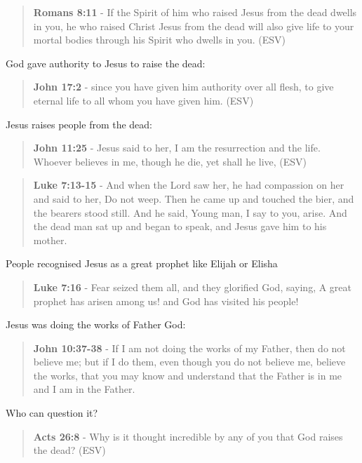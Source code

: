 \documentclass[11pt]{article}
\begin{document}
\begin{quote}
\textbf{Romans 8:11} - If the Spirit of him who raised Jesus from the dead dwells in you, he who raised Christ Jesus from the dead will also give life to your mortal bodies through his Spirit who dwells in you. (ESV)
\end{quote}

God gave authority to Jesus to raise the dead:

\begin{quote}
\textbf{John 17:2} - since you have given him authority over all flesh, to give eternal life to all whom you have given him. (ESV)
\end{quote}

Jesus raises people from the dead:

\begin{quote}
\textbf{John 11:25} - Jesus said to her, I am the resurrection and the life. Whoever believes in me, though he die, yet shall he live, (ESV)
\end{quote}

\begin{quote}
\textbf{Luke 7:13-15} - And when the Lord saw her, he had compassion on her and said to her, Do not weep. Then he came up and touched the bier, and the bearers stood still. And he said, Young man, I say to you, arise. And the dead man sat up and began to speak, and Jesus gave him to his mother.
\end{quote}

People recognised Jesus as a great prophet like Elijah or Elisha

\begin{quote}
\textbf{Luke 7:16} - Fear seized them all, and they glorified God, saying, A great prophet has arisen among us! and God has visited his people!
\end{quote}

Jesus was doing the works of Father God:

\begin{quote}
\textbf{John 10:37-38} - If I am not doing the works of my Father, then do not believe me; but if I do them, even though you do not believe me, believe the works, that you may know and understand that the Father is in me and I am in the Father.
\end{quote}

Who can question it?

\begin{quote}
\textbf{Acts 26:8} -  Why is it thought incredible by any of you that God raises the dead?  (ESV)
\end{quote}
\end{document}
